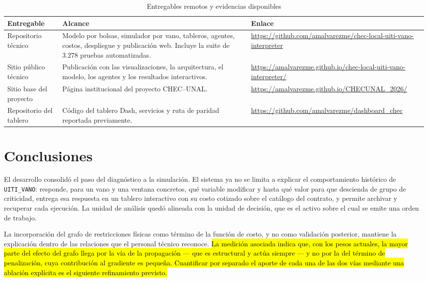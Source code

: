 \documentclass[11pt,a4paper]{article}
\newcommand{\nv}[1]{\hl{#1}}
\begin{document}
\begin{table}[H]
\centering
\caption{Entregables remotos y evidencias disponibles}
\label{tab:entregables}
\small
\begin{tabularx}{\textwidth}{L{3.1cm} L{4.6cm} X}
\toprule
\textbf{Entregable} & \textbf{Alcance} & \textbf{Enlace} \\
\midrule
Repositorio técnico & Modelo por bolsas, simulador por vano, tableros, agentes, costos, despliegue y publicación web. Incluye la suite de 3.278 pruebas automatizadas. & \url{https://github.com/amalvarezme/chec-local-uiti-vano-interpreter} \\
Sitio público técnico & Publicación con las visualizaciones, la arquitectura, el modelo, los agentes y los resultados interactivos. & \url{https://amalvarezme.github.io/chec-local-uiti-vano-interpreter/} \\
Sitio base del proyecto & Página institucional del proyecto CHEC--UNAL. & \url{https://amalvarezme.github.io/CHECUNAL_2026/} \\
Repositorio del tablero & Código del tablero Dash, servicios y ruta de paridad reportada previamente. & \url{https://github.com/amalvarezme/dashboard_chec} \\
\bottomrule
\end{tabularx}
\end{table}

\section{Conclusiones}

El desarrollo consolidó el paso del diagnóstico a la simulación. El sistema ya no se limita a
explicar el comportamiento histórico de \texttt{UITI\_VANO}: responde, para un vano y una ventana
concretos, qué variable modificar y hasta qué valor para que descienda de grupo de criticidad,
entrega esa respuesta en un tablero interactivo con su costo cotizado sobre el catálogo del
contrato, y permite archivar y recuperar cada ejecución. La unidad de análisis quedó alineada con
la unidad de decisión, que es el activo sobre el cual se emite una orden de trabajo.

La incorporación del grafo de restricciones físicas como término de la función de costo, y no
como validación posterior, mantiene la explicación dentro de las relaciones que el personal
técnico reconoce. \nv{La medición asociada indica que, con los pesos actuales, la mayor parte
del efecto del grafo llega por la vía de la propagación --- que es estructural y actúa siempre
--- y no por la del término de penalización, cuya contribución al gradiente es pequeña.
Cuantificar por separado el aporte de cada una de las dos vías mediante una ablación explícita
es el siguiente refinamiento previsto.}
\end{document}
